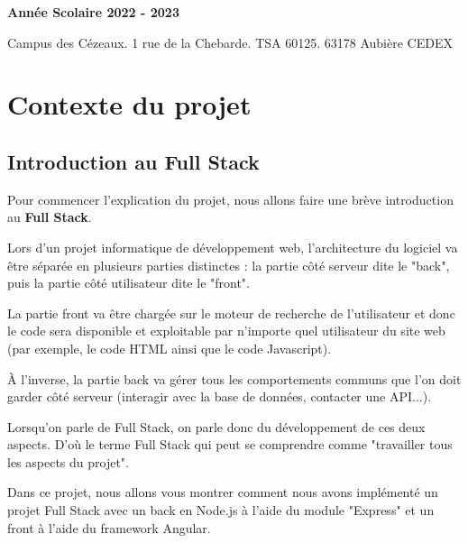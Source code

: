 \documentclass[12pt,french]{article}
\begin{document}
\begin{titlepage}
\begin{minipage}{.45\linewidth}
\begin{flushright}
  			\textbf{Année Scolaire 2022 - 2023}
  		\end{flushright} 
  	\end{minipage}
  	
  	\vspace*{2cm} 
  	
    Campus des Cézeaux. 1 rue de la Chebarde. TSA 60125. 63178 Aubière CEDEX
    	

\end{titlepage}

\restoregeometry



\normalsize\tableofcontents %

\newpage

\section{Contexte du projet}

\subsection{Introduction au Full Stack}

Pour commencer l'explication du projet, nous allons faire une brève introduction au \textbf{Full Stack}.

\medskip

Lors d'un projet informatique de développement web, l'architecture du logiciel va être séparée en plusieurs parties distinctes : la partie côté serveur dite le "back", puis la partie côté utilisateur dite le "front".

\medskip

La partie front va être chargée sur le moteur de recherche de l'utilisateur et donc le code sera disponible et exploitable par n'importe quel utilisateur du site web (par exemple, le code HTML ainsi que le code Javascript).

\medskip

À l'inverse, la partie back va gérer tous les comportements communs que l'on doit garder côté serveur (interagir avec la base de données, contacter une API...).

\medskip

Lorsqu'on parle de Full Stack, on parle donc du développement de ces deux aspects. D'où le terme Full Stack qui peut se comprendre comme "travailler tous les aspects du projet".

\medskip

Dans ce projet, nous allons vous montrer comment nous avons implémenté un projet Full Stack avec un back en Node.js à l'aide du module "Express" et un front à l'aide du framework Angular.
\end{document}
